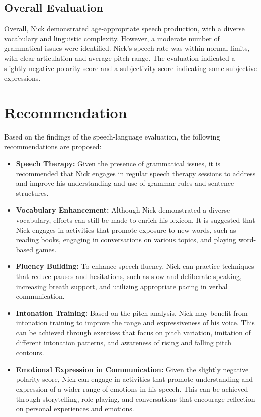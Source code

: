 \documentclass{article}
\begin{document}
\subsection{Overall Evaluation}

Overall, Nick demonstrated age-appropriate speech production, with a diverse vocabulary and linguistic complexity. However, a moderate number of grammatical issues were identified. Nick's speech rate was within normal limits, with clear articulation and average pitch range. The evaluation indicated a slightly negative polarity score and a subjectivity score indicating some subjective expressions.

\section{Recommendation}

Based on the findings of the speech-language evaluation, the following recommendations are proposed:

\begin{itemize}
    \item \textbf{Speech Therapy:} Given the presence of grammatical issues, it is recommended that Nick engages in regular speech therapy sessions to address and improve his understanding and use of grammar rules and sentence structures.
    
    \item \textbf{Vocabulary Enhancement:} Although Nick demonstrated a diverse vocabulary, efforts can still be made to enrich his lexicon. It is suggested that Nick engages in activities that promote exposure to new words, such as reading books, engaging in conversations on various topics, and playing word-based games.
    
    \item \textbf{Fluency Building:} To enhance speech fluency, Nick can practice techniques that reduce pauses and hesitations, such as slow and deliberate speaking, increasing breath support, and utilizing appropriate pacing in verbal communication.
    
    \item \textbf{Intonation Training:} Based on the pitch analysis, Nick may benefit from intonation training to improve the range and expressiveness of his voice. This can be achieved through exercises that focus on pitch variation, imitation of different intonation patterns, and awareness of rising and falling pitch contours.
    
    \item \textbf{Emotional Expression in Communication:} Given the slightly negative polarity score, Nick can engage in activities that promote understanding and expression of a wider range of emotions in his speech. This can be achieved through storytelling, role-playing, and conversations that encourage reflection on personal experiences and emotions.
\end{itemize}
\end{document}
